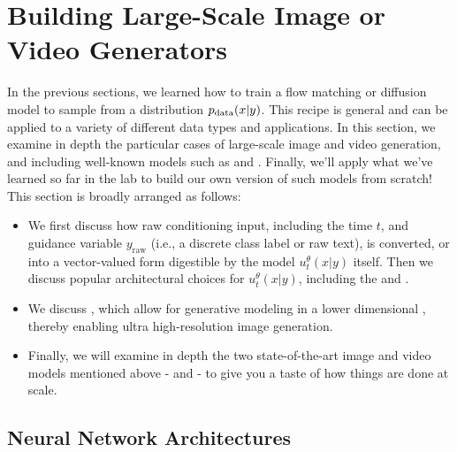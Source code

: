 \section{Building Large-Scale Image or Video Generators}
\label{sec:image_generation}
In the previous sections, we learned how to train a flow matching or diffusion model to sample from a distribution $p_{\rm{data}}(x|y)$. This recipe is general and can be applied to a variety of different data types and applications. In this section, we examine in depth the particular cases of large-scale image and video generation, and including well-known models such as  and . Finally, we'll apply what we've learned so far in the lab to build our own version of  such models from scratch! This section is broadly arranged as follows:
\begin{itemize} 
    \item[1.]  We first discuss how raw conditioning input, including the time $t$, and guidance variable $y_{\text{raw}}$ (i.e., a discrete class label or raw text), is converted, or  into a vector-valued form digestible by the model $u_t^\theta(x|y)$ itself. Then we discuss popular architectural choices for $u_t^\theta(x|y)$, including the  and .
    \item[2.]  We discuss , which allow for generative modeling in a lower dimensional , thereby enabling ultra high-resolution image generation.
    \item[3.] Finally, we will examine in depth the two state-of-the-art image and video models mentioned above -  and  - to give you a taste of how things are done at scale.
\end{itemize}


\subsection{Neural Network Architectures}
\label{sec:image_architecture}

